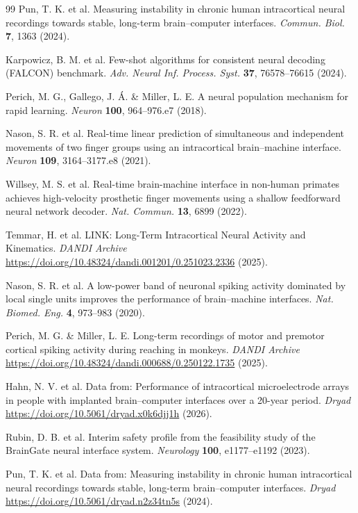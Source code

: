 \begin{thebibliography}{99}
 Pun, T. K. et al. Measuring instability in chronic human intracortical neural recordings towards stable, long-term brain--computer interfaces. \textit{Commun. Biol.} \textbf{7}, 1363 (2024).

 Karpowicz, B. M. et al. Few-shot algorithms for consistent neural decoding (FALCON) benchmark. \textit{Adv. Neural Inf. Process. Syst.} \textbf{37}, 76578--76615 (2024).

 Perich, M. G., Gallego, J. {\'A}. \& Miller, L. E. A neural population mechanism for rapid learning. \textit{Neuron} \textbf{100}, 964--976.e7 (2018).

 Nason, S. R. et al. Real-time linear prediction of simultaneous and independent movements of two finger groups using an intracortical brain--machine interface. \textit{Neuron} \textbf{109}, 3164--3177.e8 (2021).

 Willsey, M. S. et al. Real-time brain-machine interface in non-human primates achieves high-velocity prosthetic finger movements using a shallow feedforward neural network decoder. \textit{Nat. Commun.} \textbf{13}, 6899 (2022).

 Temmar, H. et al. LINK: Long-Term Intracortical Neural Activity and Kinematics. \textit{DANDI Archive} \url{https://doi.org/10.48324/dandi.001201/0.251023.2336} (2025).

 Nason, S. R. et al. A low-power band of neuronal spiking activity dominated by local single units improves the performance of brain--machine interfaces. \textit{Nat. Biomed. Eng.} \textbf{4}, 973--983 (2020).

 Perich, M. G. \& Miller, L. E. Long-term recordings of motor and premotor cortical spiking activity during reaching in monkeys. \textit{DANDI Archive} \url{https://doi.org/10.48324/dandi.000688/0.250122.1735} (2025).

 Hahn, N. V. et al. Data from: Performance of intracortical microelectrode arrays in people with implanted brain--computer interfaces over a 20-year period. \textit{Dryad} \url{https://doi.org/10.5061/dryad.x0k6djj1h} (2026).

 Rubin, D. B. et al. Interim safety profile from the feasibility study of the BrainGate neural interface system. \textit{Neurology} \textbf{100}, e1177--e1192 (2023).

 Pun, T. K. et al. Data from: Measuring instability in chronic human intracortical neural recordings towards stable, long-term brain--computer interfaces. \textit{Dryad} \url{https://doi.org/10.5061/dryad.n2z34tn5s} (2024).


\end{thebibliography}
